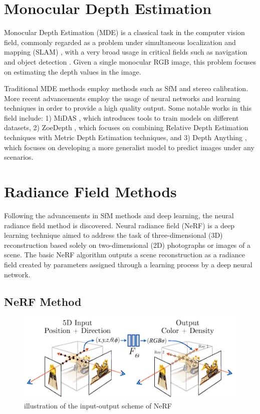 \section{Monocular Depth Estimation}

Monocular Depth Estimation (MDE) is a classical task in the computer vision field, commonly regarded as a problem under simultaneous localization and mapping (SLAM) \parencite{slam-ex}, with a very broad usage in critical fields such as navigation \parencite{mde-navigation} and object detection \parencite{mde-obstacle}. Given a single monocular RGB image, this problem focuses on estimating the depth values in the image.

Traditional MDE methods employ methods such as SfM and stereo calibration. More recent advancements employ the usage of neural networks and learning techniques \parencite{mde-nn-1} \parencite{dinov2} \parencite{mde-nn-2} \parencite{mde-nn-3} in order to provide a high quality output. Some notable works in this field include: 1) MiDAS \parencite{Midas}, which introduces tools to train models on different datasets, 2) ZoeDepth \parencite{ZoeDepth}, which focuses on combining Relative Depth Estimation techniques with Metric Depth Estimation techniques, and 3) Depth Anything \parencite{DepthAnythingV1} \parencite{DepthAnythingV2}, which focuses on developing a more generalist model to predict images under any scenarios.    

\section{Radiance Field Methods}

Following the advancements in SfM methods and deep learning, the neural radiance field method is discovered. Neural radiance field (NeRF) \parencite{nerf} is a deep learning technique aimed to address the task of three-dimensional (3D) reconstruction based solely on two-dimensional (2D) photographs or images of a scene. The basic NeRF algorithm outputs a scene reconstruction as a radiance field created by parameters assigned through a learning process by a deep neural network.

\subsection{NeRF Method}

\begin{figure}[h]
    \centering
    \includegraphics[]{figures/nerf-pipeline-1.png}
    \caption{illustration of the input-output scheme of NeRF \parencite{nerf}}
    \label{fig:nerf-pipeline}
\end{figure}

